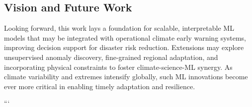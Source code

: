 \subsection{Vision and Future Work}

Looking forward, this work lays a foundation for scalable, interpretable ML models that may be integrated with operational climate early warning systems, improving decision support for disaster risk reduction. Extensions may explore unsupervised anomaly discovery, fine-grained regional adaptation, and incorporating physical constraints to foster climate-science-ML synergy. As climate variability and extremes intensify globally, such ML innovations become ever more critical in enabling timely adaptation and resilience.





```
